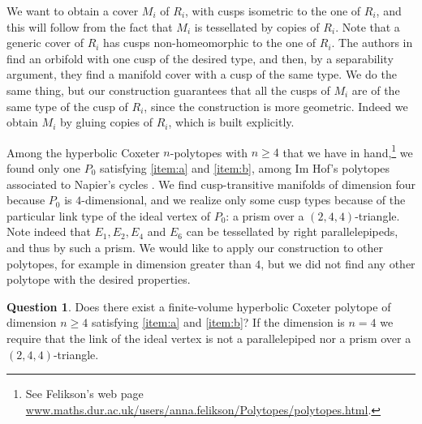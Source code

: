 \documentclass{amsart}
\theoremstyle{definition}
\newtheorem{quest}[lemma]{Question}
\theoremstyle{remark}
\begin{document}
We want to obtain a cover $M_i$ of $R_i$, with cusps isometric to the one of $R_i$, and this will follow from the fact that $M_i$ is tessellated by copies of $R_i$. Note that a generic cover of $R_i$ has cusps non-homeomorphic to the one of $R_i$. The authors in \cite{N,MR2525031} find an orbifold with one cusp of the desired type, and then, by a separability argument, they find a manifold cover with a cusp of the same type. We do the same thing, but our construction guarantees that all the cusps of $M_i$ are of the same type of the cusp of $R_i$, since the construction is more geometric. Indeed we obtain $M_i$ by gluing copies of $R_i$, which is built explicitly. 



Among the hyperbolic Coxeter $n$-polytopes with $n \geq 4$ that we have in hand,\footnote{See Felikson's web page \href{www.maths.dur.ac.uk/users/anna.felikson/Polytopes/polytopes.html}{\url{www.maths.dur.ac.uk/users/anna.felikson/Polytopes/polytopes.html}}.} we found only one $P_0$ satisfying \ref{item:a} and \ref{item:b}, among Im Hof's polytopes associated to Napier's cycles \cite{IH}. We find cusp-transitive manifolds of dimension four because $P_0$ is $4$-dimensional, and we realize only some cusp types because of the particular link type of the ideal vertex of $P_0$: a prism over a $(2,4,4)$-triangle.  Note indeed that $E_1, E_2, E_4$ and $E_6$ can be tessellated by right parallelepipeds, and thus by such a prism. We would like to apply our construction to other polytopes, for example in dimension greater than $4$, but we did not find any other polytope with the desired properties.

\begin{quest}
Does there exist a finite-volume hyperbolic Coxeter polytope of dimension $n \geq 4$ satisfying \ref{item:a} and \ref{item:b}? If the dimension is $n=4$ we require that the link of the ideal vertex is not a parallelepiped nor a prism over a $(2,4,4)$-triangle.
\end{quest}
\end{document}
